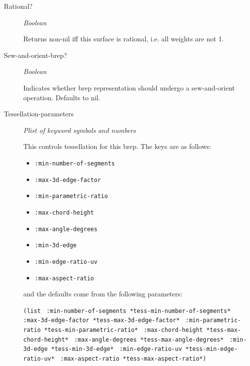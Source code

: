\documentclass [11pt]{book}
\begin{document}
\begin{itemize}
\begin{description}
\item [Rational?]
\emph{Boolean}

 Returns non-nil iff this surface is rational, i.e. all weights are not 1.




\item [Sew-and-orient-brep?]
\emph{Boolean}

 Indicates whether brep representation should undergo a
sew-and-orient operation. Defaults to nil.




\item [Tessellation-parameters]
\emph{Plist of keyword symbols and numbers}

 This controls tessellation for this brep.
The keys are as follows:
\texttt{}

\begin{itemize}
\texttt{}
\item \texttt{:min-number-of-segments}
\texttt{}
\item \texttt{:max-3d-edge-factor}
\texttt{}
\item \texttt{:min-parametric-ratio}
\texttt{}
\item \texttt{:max-chord-height}
\texttt{}
\item \texttt{:max-angle-degrees}
\texttt{}
\item \texttt{:min-3d-edge}
\texttt{}
\item \texttt{:min-edge-ratio-uv}
\texttt{}
\item \texttt{:max-aspect-ratio}
\texttt{}
\end{itemize}

\texttt{}
and the defaults come from the following parameters:
\texttt{}

\begin{description}
\texttt{}\texttt{(list }
\texttt{}\texttt{:min-number-of-segments *tess-min-number-of-segments* }
\texttt{}\texttt{:max-3d-edge-factor *tess-max-3d-edge-factor* }
\texttt{}\texttt{:min-parametric-ratio *tess-min-parametric-ratio* }
\texttt{}\texttt{:max-chord-height *tess-max-chord-height* }
\texttt{}\texttt{:max-angle-degrees *tess-max-angle-degrees* }
\texttt{}\texttt{:min-3d-edge *tess-min-3d-edge* }
\texttt{}\texttt{:min-edge-ratio-uv *tess-min-edge-ratio-uv* }
\texttt{}\texttt{:max-aspect-ratio *tess-max-aspect-ratio*) }
\texttt{}
\end{description}


\end{description}
\end{itemize}
\end{document}
